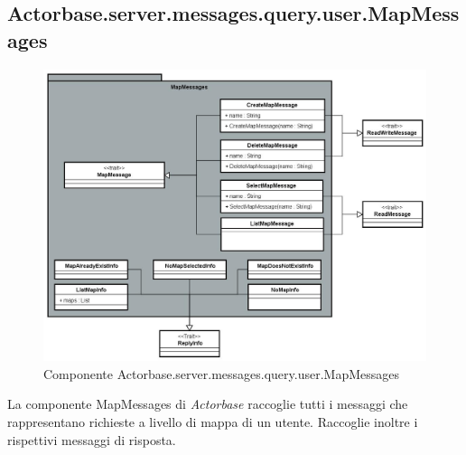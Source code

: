 \documentclass[a4paper]{article}
\begin{document}
	\subsection{Actorbase.server.messages.query.user.MapMessages}
		\begin{figure}[H]
			\centering
			\includegraphics[scale=0.35]{Server/mapMessagesLevel.jpg}
			\caption{Componente Actorbase.server.messages.query.user.MapMessages}
		\end{figure}
		La componente MapMessages di \emph{Actorbase} raccoglie tutti i messaggi che rappresentano richieste a livello di mappa di un utente. Raccoglie inoltre i rispettivi messaggi di risposta.
		
\end{document}
